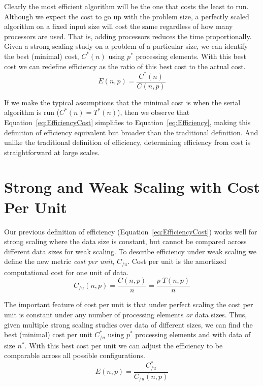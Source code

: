 \documentclass[conference]{IEEEtran}
\newcommand*{\keyterm}[1]{\emph{#1}}
\begin{document}
Clearly the most efficient algorithm will be the one that costs the least
to run. Although we expect the cost to go up with the problem size, a
perfectly scaled algorithm on a fixed input size will cost the same
regardless of how many processors are used. That is, adding processors
reduces the time proportionally. Given a strong scaling study on a problem
of a particular size, we can identify the best (minimal) cost, $C^*(n)$
using $p^*$ processing elements. With this best cost we can redefine
efficiency as the ratio of this best cost to the actual cost.
\begin{equation}
  E(n,p) = \frac{C^*(n)}{C(n,p)}
  \label{eq:EfficiencyCost}
\end{equation}

If we make the typical assumptions that the minimal cost is when the serial
algorithm is run ($C^*(n) = T^*(n)$), then we observe that
Equation~\ref{eq:EfficiencyCost} simplifies to
Equation~\ref{eq:Efficiency}, making this definition of efficiency
equivalent but broader than the traditional definition. And unlike the
traditional definition of efficiency, determining efficiency from cost is
straightforward at large scales.


\section{Strong and Weak Scaling with Cost Per Unit}
\label{sec:CostPerUnit}

\noindent
Our previous definition of efficiency (Equation~\ref{eq:EfficiencyCost})
works well for strong scaling where the data size is constant, but cannot
be compared across different data sizes for weak scaling. To describe
efficiency under weak scaling we define the new metric \keyterm{cost per
  unit}, $C_{/u}$. Cost per unit is the amortized computational cost for
one unit of data.
\begin{equation}
  C_{/u}(n,p) = \frac{C(n,p)}{n} = \frac{p \; T(n,p)}{n}
  \label{eq:CostPerUnit}
\end{equation}

The important feature of cost per unit is that under perfect scaling the
cost per unit is constant under any number of processing elements \emph{or}
data sizes. Thus, given multiple strong scaling studies over data of
different sizes, we can find the best (minimal) cost per unit $C_{/u}^*$
using $p^*$ processing elements and with data of size $n^*$. With this best
cost per unit we can adjust the efficiency to be comparable across all
possible configurations.
\begin{equation}
  E(n,p) = \frac{C_{/u}^*}{C_{/u}(n,p)}
  \label{eq:EfficiencyCostPerUnit}
\end{equation}
\end{document}
